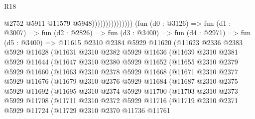 \begin{lexlean}{R18}
\begin{coremodule}
                                      @2752
                                      @5911
                                      @11579
                                      @5948)))))))))))))))
        (fun (d0 : @3126) =>
        fun (d1 : @3007) =>
        fun (d2 : @2826) =>
        fun (d3 : @3400) =>
        fun (d4 : @2971) =>
        fun (d5 : @3400) =>
        @11615
          @2310
          @2384
          @5929
          @11620
          (@11623
            @2336
            @2383
            @5929
            @11628
            (@11631
              @2310
              @2382
              @5929
              @11636
              (@11639
                @2310
                @2381
                @5929
                @11644
                (@11647
                  @2310
                  @2380
                  @5929
                  @11652
                  (@11655
                    @2310
                    @2379
                    @5929
                    @11660
                    (@11663
                      @2310
                      @2378
                      @5929
                      @11668
                      (@11671
                        @2310
                        @2377
                        @5929
                        @11676
                        (@11679
                          @2310
                          @2376
                          @5929
                          @11684
                          (@11687
                            @2310
                            @2375
                            @5929
                            @11692
                            (@11695
                              @2310
                              @2374
                              @5929
                              @11700
                              (@11703
                                @2310
                                @2373
                                @5929
                                @11708
                                (@11711
                                  @2310
                                  @2372
                                  @5929
                                  @11716
                                  (@11719
                                    @2310
                                    @2371
                                    @5929
                                    @11724
                                    (@11729
                                      @2310
                                      @2370
                                      @11736
                                      @11761

\end{coremodule}
\end{lexlean}
